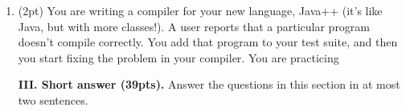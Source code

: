 \documentclass{report}
\newif\ifkey
\newcommand{\answershort}[1]{\ifkey\color{red}\underline{\textbf{#1}}\color{black}\else\underline{\hspace{3in}}\fi\xspace}
\newcommand{\answerlong}[1]{\ifkey\color{red}\textbf{#1}\color{black}\else\vspace{0.5in}\fi\xspace}
\newcommand{\shortpts}{39}
\newcommand*{\pts}[1]{\addtocounter{points}{#1}(#1pt)}
\begin{document}
\begin{spacing}{1.4}
\begin{enumerate}[leftmargin=*]
   \item \pts{2} You are writing a compiler for your new language, Java++ (it's like Java, but with more classes!).
     A user reports that a particular program doesn't compile correctly. You add that program to your test suite,
     and then you start fixing the problem in your compiler. You are practicing
     \\ \answershort{test-driven development}
     
  \newpage

  \textbf{III. Short answer (\shortpts pts).} Answer the questions in this section in at most two sentences.








\end{enumerate}
\end{spacing}
\end{document}
